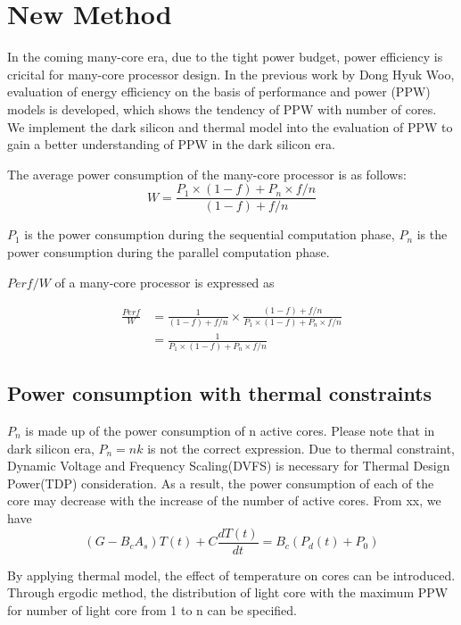 \section{New Method}
In the coming many-core era, due to the tight power budget, power efficiency is cricital for
many-core processor design. In the previous work by Dong Hyuk Woo, evaluation of energy
efficiency on the basis of performance and power (PPW) models is developed, which shows the
tendency of PPW with number of cores. We implement the dark silicon and thermal model into the
evaluation of PPW to gain a better understanding of PPW in the dark silicon era.

The average power consumption of the many-core processor is as follows:
\begin{equation}\label{average_power}
W = \frac{P_{1} \times (1-f)+P_{n} \times f/n}{(1-f)+f/n}
\end{equation}

$P_{1}$ is the power consumption during the sequential computation phase, $P_{n}$ is the power 
consumption during the parallel computation phase. 

$Perf/W$ of a many-core processor is expressed as

\begin{align*}
\frac{Perf}{W} &= \frac{1}{(1-f)+f/n} \times \frac{(1-f)+f/n}{P_{1} \times (1-f)+P_{n} \times f/n}\\
&= \frac{1}{P_{1} \times (1-f)+P_{n} \times f/n}
\end{align*}


\subsection{Power consumption with thermal constraints}
$P_{n}$ is made up of the power consumption of n active cores. Please note that in dark silicon
era, $P_{n} = nk$ is not the correct expression. Due to thermal constraint, Dynamic Voltage and
Frequency Scaling(DVFS) is necessary for Thermal Design Power(TDP) consideration. As a result,
the power consumption of each of the core may decrease with the increase of the number of active cores.
From xx, we have
\begin{equation}\label{gt=bp}
(G - B_{c}A_{s})T(t) + C\frac{dT(t)}{dt}= B_{c}(P_{d}(t) + P_{0})
\end{equation}

By applying thermal model, the effect of temperature on cores can be introduced. 
Through ergodic method, the distribution of light core with the maximum PPW
for number of light core from 1 to n can be specified.

